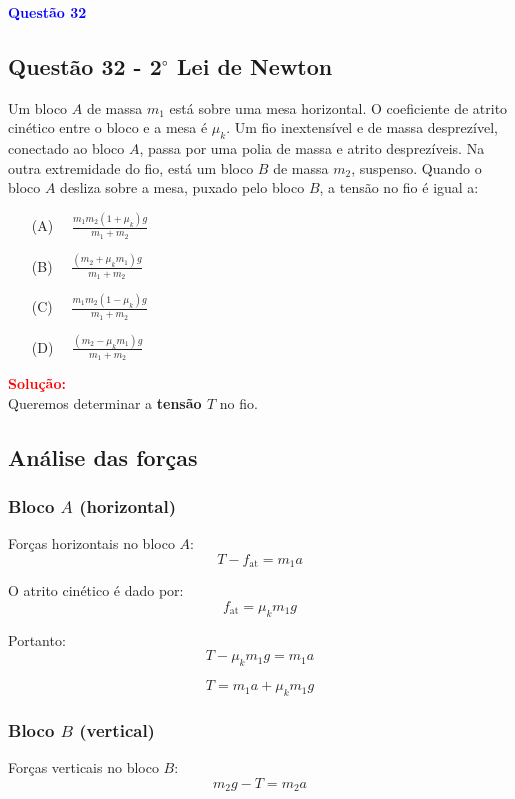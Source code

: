 \documentclass[a4paper,12pt]{article}
\begin{document}
\begin{flushleft}
\textbf{\textcolor{blue}{\Large Quest\~ao 32}}\\
\noindent
\subsection{Quest\~ao 32 - 2$^{\circ}$ Lei de Newton}
Um bloco \(A\) de massa \(m_1\) está sobre uma mesa horizontal.  
O coeficiente de atrito cinético entre o bloco e a mesa é \(\mu_k\).  
Um fio inextensível e de massa desprezível, conectado ao bloco \(A\), passa por uma polia de massa e atrito desprezíveis.  
Na outra extremidade do fio, está um bloco \(B\) de massa \(m_2\), suspenso.  
Quando o bloco \(A\) desliza sobre a mesa, puxado pelo bloco \(B\), a tensão no fio é igual a:


\begin{itemize}
\item[(A)] $\quad \frac{m_1 m_2 (1 + \mu_k) g}{m_1 + m_2}
\qquad$
\item[(B)] $\quad \frac{(m_2 + \mu_k m_1) g}{m_1 + m_2}\qquad$
\item[(C)] $\quad \frac{m_1 m_2 (1 - \mu_k) g}{m_1 + m_2}
\qquad$
\item[(D)] $\quad \frac{(m_2 - \mu_k m_1) g}{m_1 + m_2}$
\end{itemize}

\vspace{0.5cm}


\textcolor{red}{\textbf{Solução:}}\\

Queremos determinar a \textbf{tensão \( T \)} no fio.

\subsection*{Análise das forças}

\subsubsection*{Bloco \( A \) (horizontal)}
Forças horizontais no bloco \( A \):
\[
T - f_{\text{at}} = m_1 a
\]

O atrito cinético é dado por:
\[
f_{\text{at}} = \mu_k m_1 g
\]

Portanto:
\[
T - \mu_k m_1 g = m_1 a
\]

\[
T = m_1 a + \mu_k m_1 g
\]

\subsubsection*{Bloco \( B \) (vertical)}
Forças verticais no bloco \( B \):
\[
m_2 g - T = m_2 a
\]


\end{flushleft}
\end{document}
